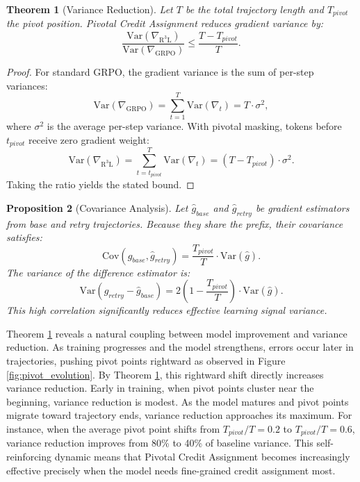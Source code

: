 \documentclass{article} %
\newtheorem{theorem}{Theorem}
\newtheorem{proposition}[theorem]{Proposition}
\theoremstyle{definition}
\theoremstyle{remark}
\begin{document}
\begin{theorem}[Variance Reduction]
\label{thm:variance_reduction}
Let $T$ be the total trajectory length and $T_{pivot}$ the pivot position. Pivotal Credit Assignment reduces gradient variance by:
\begin{equation}
\frac{\mathrm{Var}(\nabla_{\mathrm{R^3L}})}{\mathrm{Var}(\nabla_{\mathrm{GRPO}})} \leq \frac{T - T_{pivot}}{T}.
\end{equation}
\end{theorem}

\begin{proof}
For standard GRPO, the gradient variance is the sum of per-step variances:
\begin{equation}
\mathrm{Var}(\nabla_{\text{GRPO}}) = \sum_{t=1}^{T} \mathrm{Var}(\nabla_t) = T \cdot \sigma^2,
\end{equation}
where $\sigma^2$ is the average per-step variance. With pivotal masking, tokens before $t_{pivot}$ receive zero gradient weight:
\begin{equation}
\mathrm{Var}(\nabla_{\mathrm{R^3L}}) =\sum_{t=t_{pivot}}^{T} \mathrm{Var}(\nabla_t) = (T - T_{pivot}) \cdot \sigma^2.
\end{equation}
Taking the ratio yields the stated bound.
\end{proof}

\begin{proposition}[Covariance Analysis]
\label{prop:covariance}
Let $\hat{g}_{base}$ and $\hat{g}_{retry}$ be gradient estimators from base and retry trajectories. Because they share the prefix, their covariance satisfies:
\begin{equation}
\mathrm{Cov}(\hat{g}_{base}, \hat{g}_{retry}) = \frac{T_{pivot}}{T} \cdot \mathrm{Var}(\hat{g}).
\end{equation}
The variance of the difference estimator is:
\begin{equation}
\mathrm{Var}(\hat{g}_{retry} - \hat{g}_{base}) = 2\left(1 - \frac{T_{pivot}}{T}\right) \cdot \mathrm{Var}(\hat{g}).
\end{equation}
This high correlation significantly reduces effective learning signal variance.
\end{proposition}

Theorem \ref{thm:variance_reduction} reveals a natural coupling between model improvement and variance reduction. As training progresses and the model strengthens, errors occur later in trajectories, pushing pivot points rightward as observed in Figure \ref{fig:pivot_evolution}. By Theorem \ref{thm:variance_reduction}, this rightward shift directly increases variance reduction. Early in training, when pivot points cluster near the beginning, variance reduction is modest. As the model matures and pivot points migrate toward trajectory ends, variance reduction approaches its maximum. For instance, when the average pivot point shifts from $T_{pivot}/T = 0.2$ to $T_{pivot}/T = 0.6$, variance reduction improves from 80\% to 40\% of baseline variance. This self-reinforcing dynamic means that Pivotal Credit Assignment becomes increasingly effective precisely when the model needs fine-grained credit assignment most.
\end{document}

